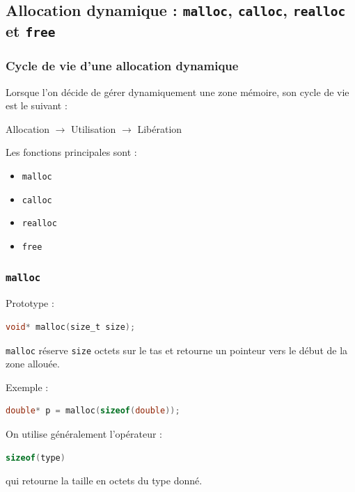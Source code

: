 \subsection{Allocation dynamique : \texttt{malloc}, \texttt{calloc}, \texttt{realloc} et \texttt{free}}

\subsubsection{Cycle de vie d’une allocation dynamique}

Lorsque l’on décide de gérer dynamiquement une zone mémoire, son cycle de vie est le suivant :

\begin{center}
Allocation $\longrightarrow$ Utilisation $\longrightarrow$ Libération
\end{center}

Les fonctions principales sont :

\begin{itemize}
    \item \texttt{malloc}
    \item \texttt{calloc}
    \item \texttt{realloc}
    \item \texttt{free}
\end{itemize}

\subsubsection{\texttt{malloc}}

Prototype :

\begin{lstlisting}[language=C]
void* malloc(size_t size);
\end{lstlisting}

\texttt{malloc} réserve \texttt{size} octets sur le tas et retourne un pointeur
vers le début de la zone allouée.

Exemple :

\begin{lstlisting}[language=C]
double* p = malloc(sizeof(double));
\end{lstlisting}

On utilise généralement l’opérateur :

\begin{lstlisting}[language=C]
sizeof(type)
\end{lstlisting}

qui retourne la taille en octets du type donné.

